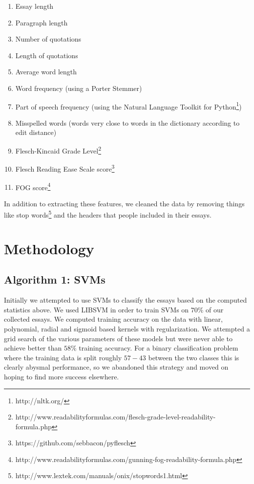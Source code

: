 \documentclass[11pt,acticle]{scrartcl}
\begin{document}
\begin{multicols}{2}
\begin{enumerate}
  \item Essay length
  \item Paragraph length
  \item Number of quotations
  \item Length of quotations
  \item Average word length
  \item Word frequency (using a Porter Stemmer)
  \item Part of speech frequency (using the Natural Language Toolkit for Python\footnote{http://nltk.org/})
  \item Misspelled words (words very close to words in the dictionary according to edit distance)
  \item Flesch-Kincaid Grade Level\footnote{http://www.readabilityformulas.com/flesch-grade-level-readability-formula.php}
  \item Flesch Reading Ease Scale score\footnote{https://github.com/sebbacon/pyflesch}
  \item FOG score\footnote{http://www.readabilityformulas.com/gunning-fog-readability-formula.php}

\end{enumerate}

In addition to extracting these features, we cleaned the data by removing things like stop words\footnote{http://www.lextek.com/manuals/onix/stopwords1.html} and the headers that people included in their essays.

\section{Methodology}

\subsection{Algorithm 1: SVMs}

Initially we attempted to use SVMs to classify the essays based on the computed statistics above. We used LIBSVM in order to train SVMs on $70\%$ of our collected essays. We computed training accuracy on the data with linear, polynomial, radial and sigmoid based kernels with regularization. We attempted a grid search of the various parameters of these models but were never able to achieve better than $58\%$ training accuracy. For a binary classification problem where the training data is split roughly $57-43$ between the two classes this is clearly abysmal performance, so we abandoned this strategy and moved on hoping to find more success elsewhere.


\end{multicols}
\end{document}

